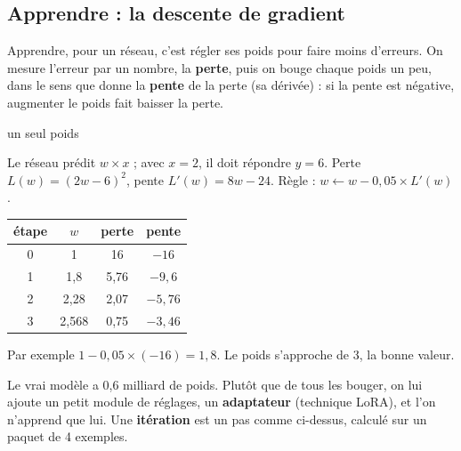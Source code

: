 \documentclass[fontsize=10pt,paper=a4,parskip=half-]{scrartcl}
\newcommand{\q}[1]{\og #1\fg{}}
\begin{document}
\subsection{Apprendre : la descente de gradient}
Apprendre, pour un réseau, c'est régler ses poids pour faire moins d'erreurs. On mesure
l'erreur par un nombre, la \textbf{perte}, puis on bouge chaque poids un peu, dans le
sens que donne la \textbf{pente} de la perte (sa dérivée) : si la pente est négative,
augmenter le poids fait baisser la perte.

\begin{calcul}{un seul poids}
\begin{minipage}{0.55\linewidth}
\raggedright
Le réseau prédit $w\times x$ ; avec $x=2$, il doit répondre $y=6$.
Perte $L(w) = (2w-6)^2$, pente $L'(w) = 8w-24$. Règle :
$w \leftarrow w - 0,05\times L'(w)$.

\smallskip
\centering\small
\begin{tabular}{cccc}
\toprule
étape & $w$ & perte & pente\\
\midrule
0 & 1 & 16 & $-16$\\
1 & 1,8 & 5,76 & $-9,6$\\
2 & 2,28 & 2,07 & $-5,76$\\
3 & 2,568 & 0,75 & $-3,46$\\
\bottomrule
\end{tabular}

\raggedright\smallskip
Par exemple $1 - 0,05\times(-16) = 1,8$. Le poids s'approche de 3, la bonne valeur.
\end{minipage}\hfill
\begin{minipage}{0.4\linewidth}
\centering
{}
\end{minipage}
\end{calcul}

Le vrai modèle a 0,6 milliard de poids. Plutôt que de tous les bouger, on lui ajoute un
petit module de réglages, un \textbf{adaptateur} (technique \q{LoRA}), et l'on n'apprend
que lui. Une \textbf{itération} est un pas comme ci-dessus, calculé sur un paquet de 4
exemples.
\end{document}
